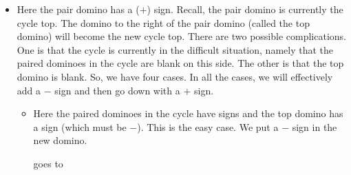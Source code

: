 \documentclass[12pt]{article}
\numberwithin{equation}{section}
\newcommand{\horizontalDominoRSShift}[4]{\filldraw [dominoRSStyle] (#2 - 1 + #4 + \eps, #1 - 1 + \eps) rectangle + (2 - \teps, 1 -\teps) node [dominoText] {$#3$};}
\newcommand{\verticalDominoRSShift}[4]{\filldraw [dominoRSStyle] (#2 - 1 + #4 + \eps,  #1 - 1 + \eps) rectangle + (1 - \teps,2 -\teps) node [dominoText] {$#3$};}
\begin{document}
\begin{itemize}
\begin{itemize}
      \item Here the pair domino has a ($+$) sign.
      Recall, the pair domino is currently the cycle top.
      The domino to the right of the pair domino (called the top domino) will become the new cycle top.
      There are two possible complications.
      One is that the cycle is currently in the difficult situation, namely that the paired dominoes in the cycle are blank on this side.
      The other is that the top domino is blank.
      So, we have four cases.
      In all the cases, we will effectively add a $-$ sign and then go down with a $+$ sign.
      \begin{itemize}
        \item Here the paired dominoes in the cycle have signs and the top domino has a sign (which must be $-$).
        This is the easy case.
        We put a $-$ sign in the new domino.
        \begin{figure}[H]
          \centering
        \end{figure}
        goes to
        \begin{figure}[H]
          \centering

\end{figure}
\end{itemize}
\end{itemize}
\end{itemize}
\end{document}
